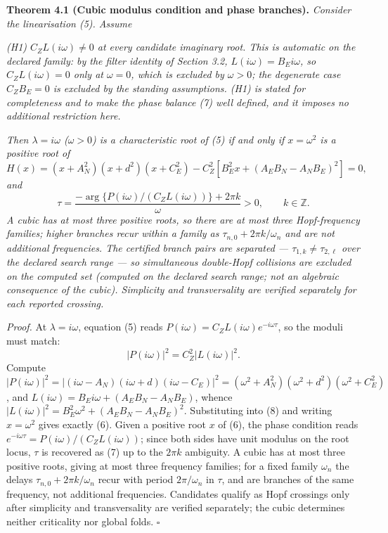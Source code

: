 \documentclass[11pt]{article}
\begin{document}
\textbf{Theorem 4.1 (Cubic modulus condition and phase branches).}
\emph{Consider the linearisation (5). Assume}

\emph{(H1) \(C_Z L(i\omega) \neq 0\) at every candidate imaginary root.
This is automatic on the declared family: by the filter identity of
Section 3.2, \(L(i\omega) = B_E i\omega\), so \(C_Z L(i\omega) = 0\)
only at \(\omega = 0\), which is excluded by \(\omega > 0\); the
degenerate case \(C_Z B_E = 0\) is excluded by the standing assumptions.
(H1) is stated for completeness and to make the phase balance (7) well
defined, and it imposes no additional restriction here.}

\emph{Then \(\lambda = i\omega\) (\(\omega > 0\)) is a characteristic
root of (5) if and only if \(x = \omega^2\) is a positive root of}
\[H(x) = (x + A_N^2)(x + d^2)(x + C_E^2) - C_Z^2\left[ B_E^2 x + (A_E B_N - A_N B_E)^2 \right] = 0, \tag{6}\]
\emph{and}
\[\tau = \frac{-\arg\{P(i\omega)/(C_Z L(i\omega))\} + 2\pi k}{\omega} > 0, \qquad k \in \mathbb{Z}. \tag{7}\]
\emph{A cubic has at most three positive roots, so there are at most
three Hopf-frequency families; higher branches recur within a family as
\(\tau_{n,0} + 2\pi k/\omega_n\) and are not additional frequencies. The
certified branch pairs are separated ---
\(\tau_{1,k} \neq \tau_{2,\ell}\) over the declared search range --- so
simultaneous double-Hopf collisions are excluded on the computed set
(computed on the declared search range; not an algebraic consequence of
the cubic). Simplicity and transversality are verified separately for
each reported crossing.}

\emph{Proof.} At \(\lambda = i\omega\), equation (5) reads
\(P(i\omega) = C_Z L(i\omega)e^{-i\omega\tau}\), so the moduli must
match: \[|P(i\omega)|^2 = C_Z^2 |L(i\omega)|^2. \tag{8}\] Compute
\(|P(i\omega)|^2 = |(i\omega - A_N)(i\omega + d)(i\omega - C_E)|^2 = (\omega^2 + A_N^2)(\omega^2 + d^2)(\omega^2 + C_E^2)\),
and \(L(i\omega) = B_E i\omega + (A_E B_N - A_N B_E)\), whence
\(|L(i\omega)|^2 = B_E^2\omega^2 + (A_E B_N - A_N B_E)^2\). Substituting
into (8) and writing \(x = \omega^2\) gives exactly (6). Given a
positive root \(x\) of (6), the phase condition reads
\(e^{-i\omega\tau} = P(i\omega)/(C_Z L(i\omega))\); since both sides
have unit modulus on the root locus, \(\tau\) is recovered as (7) up to
the \(2\pi k\) ambiguity. A cubic has at most three positive roots,
giving at most three frequency families; for a fixed family \(\omega_n\)
the delays \(\tau_{n,0} + 2\pi k/\omega_n\) recur with period
\(2\pi/\omega_n\) in \(\tau\), and are branches of the same frequency,
not additional frequencies. Candidates qualify as Hopf crossings only
after simplicity and transversality are verified separately; the cubic
determines neither criticality nor global folds. \ensuremath{\square}
\end{document}
